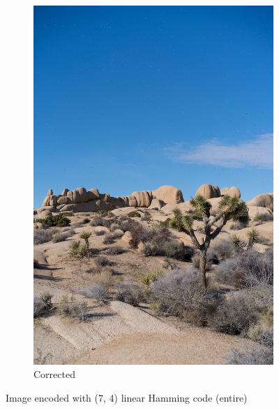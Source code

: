 \documentclass{article}
\begin{document}
\begin{figure}[htb]
\begin{subfigure}[b]{0.32\textwidth}
        \includegraphics[width=\textwidth]{../Result/Linear/linear-bsc-output-syndrome-corrected.png}
        \caption{Corrected}
        \label{fig:image-linear-syndrome-corrected}
    \end{subfigure}
       \caption{Image encoded with (7, 4) linear Hamming code (entire)}
       \label{fig:image-linear}
\end{figure}
\end{document}
